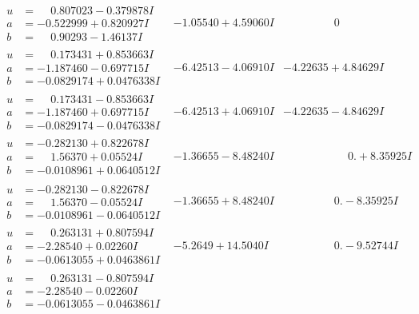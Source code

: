\documentclass[1p]{elsarticle_modified}
\theoremstyle{definition}
\begin{document}
$$\begin{array}{c|c|c}
\begin{aligned}
u &= \phantom{-}0.807023 - 0.379878 I \\
a &= -0.522999 + 0.820927 I \\
b &= \phantom{-}0.90293 - 1.46137 I\end{aligned}
 & -1.05540 + 4.59060 I & \phantom{-0.000000 } 0 \\ \hline\begin{aligned}
u &= \phantom{-}0.173431 + 0.853663 I \\
a &= -1.187460 - 0.697715 I \\
b &= -0.0829174 + 0.0476338 I\end{aligned}
 & -6.42513 - 4.06910 I & -4.22635 + 4.84629 I \\ \hline\begin{aligned}
u &= \phantom{-}0.173431 - 0.853663 I \\
a &= -1.187460 + 0.697715 I \\
b &= -0.0829174 - 0.0476338 I\end{aligned}
 & -6.42513 + 4.06910 I & -4.22635 - 4.84629 I \\ \hline\begin{aligned}
u &= -0.282130 + 0.822678 I \\
a &= \phantom{-}1.56370 + 0.05524 I \\
b &= -0.0108961 + 0.0640512 I\end{aligned}
 & -1.36655 - 8.48240 I & \phantom{-0.000000 -}0. + 8.35925 I \\ \hline\begin{aligned}
u &= -0.282130 - 0.822678 I \\
a &= \phantom{-}1.56370 - 0.05524 I \\
b &= -0.0108961 - 0.0640512 I\end{aligned}
 & -1.36655 + 8.48240 I & \phantom{-0.000000 } 0. - 8.35925 I \\ \hline\begin{aligned}
u &= \phantom{-}0.263131 + 0.807594 I \\
a &= -2.28540 + 0.02260 I \\
b &= -0.0613055 + 0.0463861 I\end{aligned}
 & -5.2649 + 14.5040 I & \phantom{-0.000000 } 0. - 9.52744 I \\ \hline\begin{aligned}
u &= \phantom{-}0.263131 - 0.807594 I \\
a &= -2.28540 - 0.02260 I \\
b &= -0.0613055 - 0.0463861 I\end{aligned}

\end{array}$$
\end{document}
